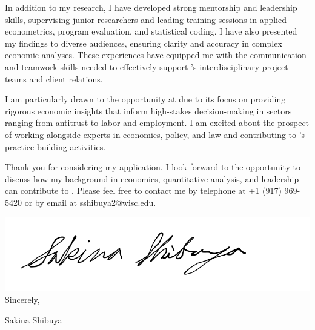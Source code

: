 \documentclass[12pt]{letter}
\begin{document}
In addition to my research, I have developed strong mentorship and leadership skills, supervising junior researchers and leading training sessions 
in applied econometrics, program evaluation, and statistical coding. I have also presented my findings to diverse audiences, ensuring clarity and accuracy 
in complex economic analyses. These experiences have equipped me with the communication and teamwork skills needed to effectively support 
\compName's interdisciplinary project teams and client relations.

I am particularly drawn to the opportunity at \compName \hspace{1mm} due to its focus on providing rigorous economic insights that inform high-stakes decision-making in 
sectors ranging from antitrust to labor and employment. I am excited about the prospect of working alongside experts in economics, policy, and law and 
contributing to \compName's practice-building activities.

Thank you for considering my application. I look forward to the opportunity to discuss how my background in economics, quantitative analysis, and 
leadership can contribute to \compName. Please feel free to contact me by telephone at +1 (917) 969-5420 or by email at sshibuya2@wisc.edu.

\bigskip

\includegraphics[height=4\baselineskip]{signature.png}  \\

\vspace*{-6.5\baselineskip}Sincerely, 

\vspace{2.5\baselineskip}Sakina Shibuya
\end{document}
